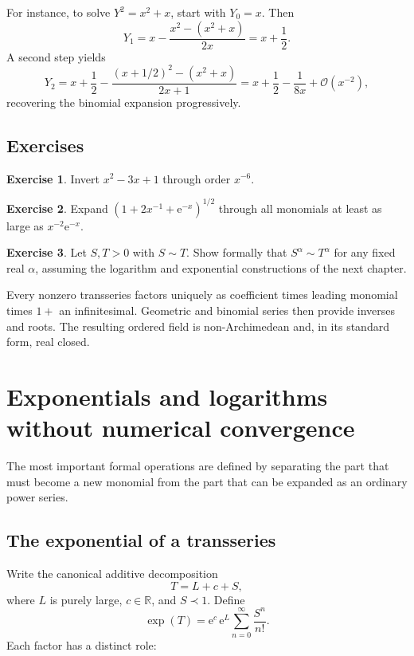 \documentclass[11pt,openany]{book}
\theoremstyle{definition}
\newtheorem{exercise}{Exercise}[chapter]
\theoremstyle{plain}
\theoremstyle{remark}
\newcommand{\R}{\mathbb{R}}
\newcommand{\e}{\mathrm{e}}
\newcommand{\bigO}{\mathcal{O}}
\newcommand{\asym}{\sim}
\newcommand{\precdom}{\prec}
\begin{document}
For instance, to solve $Y^2=x^2+x$, start with $Y_0=x$. Then
\[
 Y_1=x-\frac{x^2-(x^2+x)}{2x}
 =x+\frac12.
\]
A second step yields
\[
 Y_2=x+\frac12-\frac{(x+1/2)^2-(x^2+x)}{2x+1}
 =x+\frac12-\frac{1}{8x}+\bigO(x^{-2}),
\]
recovering the binomial expansion progressively.

\section{Exercises}

\begin{exercise}
Invert $x^2-3x+1$ through order $x^{-6}$.
\end{exercise}

\begin{exercise}
Expand $(1+2x^{-1}+\e^{-x})^{1/2}$ through all monomials at least as large as $x^{-2}\e^{-x}$.
\end{exercise}

\begin{exercise}
Let $S,T>0$ with $S\asym T$. Show formally that $S^\alpha\asym T^\alpha$ for any fixed real $\alpha$, assuming the logarithm and exponential constructions of the next chapter.
\end{exercise}

\begin{summarybox}
Every nonzero transseries factors uniquely as coefficient times leading monomial times $1+$ an infinitesimal. Geometric and binomial series then provide inverses and roots. The resulting ordered field is non-Archimedean and, in its standard form, real closed.
\end{summarybox}


\chapter{Exponentials and logarithms without numerical convergence}\label{ch:explog}

The most important formal operations are defined by separating the part that must become a new monomial from the part that can be expanded as an ordinary power series.

\section{The exponential of a transseries}

Write the canonical additive decomposition
\[
 T=L+c+S,
\]
where $L$ is purely large, $c\in\R$, and $S\precdom1$. Define
\begin{equation}\label{eq:formal-exp-definition}
 \exp(T)=\e^c\,\e^L
 \sum_{n=0}^{\infty}\frac{S^n}{n!}.
\end{equation}
Each factor has a distinct role:
\end{document}
